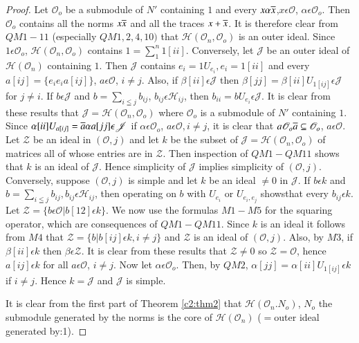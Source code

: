 \begin{proof}
Let $\mathscr{O}_o$ be a submodule of $N'$ containing $1$ and every
$x\alpha \overline{x}$,\break $x\epsilon \mathscr{O}$, $\alpha \epsilon
\mathscr{O}_o$. Then $\mathscr{O}_o$ contains all the norms $x\overline{x}$
and all the traces $x+\overline{x}$. It is therefore clear from $QM 1-11$
(especially $QM 1, 2,4, 10)$ that
$\mathscr{H}(\mathscr{O}_n,\mathscr{O}_o)$ is an outer ideal. Since
$1\epsilon \mathscr{O}_o$, $\mathscr{H}(\mathscr{O}_n, \mathscr{O}_o)$
contains $1=\sum\limits_{1}^{n}1[ii]$. Conversely, let $\mathscr{J}$ be
an outer ideal of $\mathscr{H}(\mathscr{O}_n)$ containing $1$. Then
$\mathscr{J}$ contains $e_i=1 U_{e_{i}} ,e_{i}=1[ii]$ and every
$a[ij]=\{e_ie_ia[ij]\}$, $a\epsilon \mathscr{O}$, $i\neq j$. Also, if
$\beta[ii]\epsilon\mathscr{J}$ then
$\beta[jj]=\beta[ii]U_{1[ij]}\epsilon \mathscr{J}$ for $j\neq i$. If
$b\epsilon\mathscr{J}$ and $b=\sum\limits_{i\leqq j}b_{ij}$,
$b_{ij}\epsilon \mathscr{H}_{ij}$, then $b_{ii}=bU_{e_{i}}\epsilon
\mathscr{J}$. It is clear from these results that
$\mathscr{J}=\mathscr{H}(\mathscr{O}_n, \mathscr{O}_o)$ where
$\mathscr{O}_o$ is a submodule of $N'$ containing $1$. Since
$\alpha[ii]U_{a[ij]}=\overline{a}\alpha a[jj]\epsilon \mathscr{J}$ if
$\alpha \epsilon \mathscr{O}_o$, $a\epsilon \mathscr{O}, i\neq j$, it
is clear that $a\mathscr{O}_o\overline{a}\subseteq \mathscr{O}_o$,
$a\epsilon \mathscr{O}$. Let $\mathscr{Z}$ be an ideal in
$(\mathscr{O},j)$ and let $k$ be the subset of
$\mathscr{J}=\mathscr{H}(\mathscr{O}_n,\mathscr{O}_o)$ of matrices all
of whose entries are in $\mathscr{Z}$. Then inspection of $QM 1-QM 11$
shows that $k$ is an ideal of $\mathscr{J}$. Hence simplicity of
$\mathscr{J}$ implies simplicity of $(\mathscr{O},j)$. Conversely,
suppose $(\mathscr{O}, j)$ is simple and let $k$ be an ideal $\neq 0$
in $\mathscr{J}$. If $b\epsilon k$ and $b=\sum\limits_{i\leqq j}
b_{ij}, b_{ij}\epsilon \mathscr{H}_{ij}$, then operating on $b$ with
$U_{e_{i}}$ or $U_{e_{i},e_{j}}$ shows\pageoriginale that every $b_{ij}\epsilon
k$. Let $\mathscr{Z}=\{b\epsilon \mathscr{O}|b[12]\epsilon k\}$. We
now use the formulas $M1-M5$ for the squaring operator, which are
consequences of $QM1-QM11$. Since $k$ is an ideal it follows from $M4$
that $\mathscr{Z}=\{b|b[ij]\epsilon k, i\neq j\}$ and $\mathscr{Z}$ is
an ideal of $(\mathscr{O}, j)$. Also, by $M3$, if $\beta[ii]\epsilon
k$ then $\beta \epsilon \mathscr{Z}$. It is clear from these results
that $\mathscr{Z}\neq 0$ so $\mathscr{Z}=\mathscr{O}$, hence
$a[ij]\epsilon k$ for all $a\epsilon \mathscr{O}$, $i\neq j$. Now let
$\alpha \epsilon \mathscr{O}_o$. Then, by $QM 2$,
$\alpha[jj]=\alpha[ii]U_{1[ij]}\epsilon k$ if $i\neq j$. Hence
$k=\mathscr{J}$ and $\mathscr{J}$ is simple.

It is clear from the first part of Theorem \ref{c2:thm2} that
$\mathscr{H}(\mathscr{O}_n.N_o)$,  $N_o$ the submodule generated by the norms is
the core of $\mathscr{H}(\mathscr{O}_n)$ ($=$outer ideal generated
by:1).
\end{proof}

